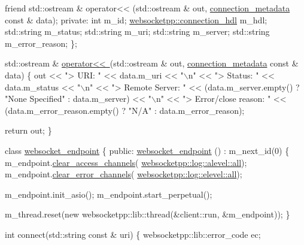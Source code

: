 \begin{DoxyCode}
    \textcolor{keyword}{friend} std::ostream & operator<< (std::ostream & out, \mbox{\hyperlink{classconnection__metadata}{connection\_metadata}} \textcolor{keyword}{const} & 
      data);
\textcolor{keyword}{private}:
    \textcolor{keywordtype}{int} m\_id;
    \mbox{\hyperlink{namespacewebsocketpp_a6b3d26a10ee7229b84b776786332631d}{websocketpp::connection\_hdl}} m\_hdl;
    std::string m\_status;
    std::string m\_uri;
    std::string m\_server;
    std::string m\_error\_reason;
\};

std::ostream & \mbox{\hyperlink{group__console_cppapi_ga9573031ece85c11fb0baeaab3a36eb73}{operator<< }}(std::ostream & out, \mbox{\hyperlink{classconnection__metadata}{connection\_metadata}} \textcolor{keyword}{const} & 
      data) \{
    out << \textcolor{stringliteral}{"> URI: "} << data.m\_uri << \textcolor{stringliteral}{"\(\backslash\)n"}
        << \textcolor{stringliteral}{"> Status: "} << data.m\_status << \textcolor{stringliteral}{"\(\backslash\)n"}
        << \textcolor{stringliteral}{"> Remote Server: "} << (data.m\_server.empty() ? \textcolor{stringliteral}{"None Specified"} : data.m\_server) << \textcolor{stringliteral}{"\(\backslash\)n"}
        << \textcolor{stringliteral}{"> Error/close reason: "} << (data.m\_error\_reason.empty() ? \textcolor{stringliteral}{"N/A"} : data.m\_error\_reason);

    \textcolor{keywordflow}{return} out;
\}

\textcolor{keyword}{class }\mbox{\hyperlink{classwebsocket__endpoint}{websocket\_endpoint}} \{
\textcolor{keyword}{public}:
    \mbox{\hyperlink{classwebsocket__endpoint}{websocket\_endpoint}} () : m\_next\_id(0) \{
        m\_endpoint.\mbox{\hyperlink{classwebsocketpp_1_1endpoint_a3fe357b3c6434273a9965eb52902575d}{clear\_access\_channels}}(
      \mbox{\hyperlink{structwebsocketpp_1_1log_1_1alevel_a853aa0b8976e53f3181af3bc398d493e}{websocketpp::log::alevel::all}});
        m\_endpoint.\mbox{\hyperlink{classwebsocketpp_1_1endpoint_a8cefa4fc37c0df4eb6ed0bcf04bb0da5}{clear\_error\_channels}}(
      \mbox{\hyperlink{structwebsocketpp_1_1log_1_1elevel_a9b31ff708c221d314f9f4eb3ff2b1ad7}{websocketpp::log::elevel::all}});

        m\_endpoint.init\_asio();
        m\_endpoint.start\_perpetual();

        m\_thread.reset(\textcolor{keyword}{new} websocketpp::lib::thread(&client::run, &m\_endpoint));
    \}

    \textcolor{keywordtype}{int} connect(std::string \textcolor{keyword}{const} & uri) \{
        websocketpp::lib::error\_code ec;


\end{DoxyCode}

